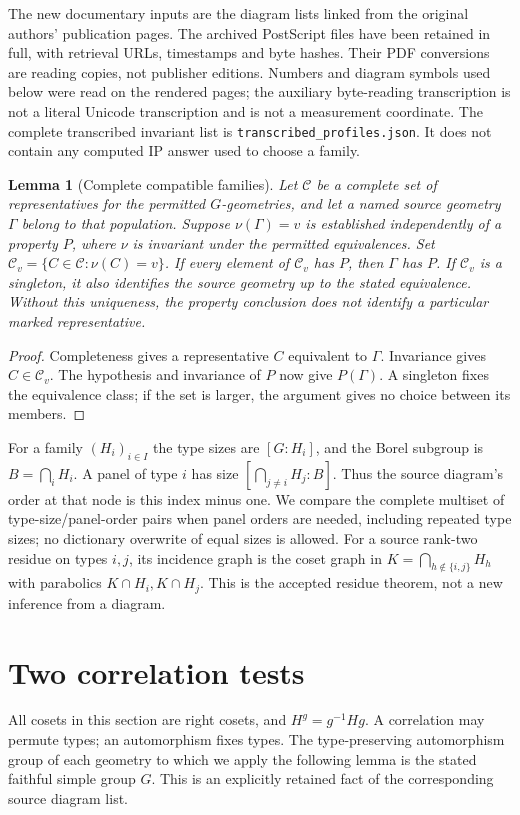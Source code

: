 \documentclass[11pt,a4paper]{article}
\newtheorem{lemma}[theorem]{Lemma}
\begin{document}
The new documentary inputs are the diagram lists linked from the
original authors' publication pages. The archived PostScript files have
been retained in full, with retrieval URLs, timestamps and byte hashes.
Their PDF conversions are reading copies, not publisher editions.
Numbers and diagram symbols used below were read on the rendered pages;
the auxiliary byte-reading transcription is not a literal Unicode
transcription and is not a measurement coordinate. The complete
transcribed invariant list is \texttt{transcribed\_profiles.json}.
It does not contain any computed IP answer used to choose a family.

\begin{lemma}[Complete compatible families]\label{fibre}
Let $\mathcal C$ be a complete set of representatives for the permitted
$G$-geometries, and let a named source geometry $\Gamma$ belong to that
population. Suppose $\nu(\Gamma)=v$ is established independently of a
property $P$, where $\nu$ is invariant under the permitted equivalences.
Set $\mathcal C_v=\{C\in\mathcal C:\nu(C)=v\}$. If every element of
$\mathcal C_v$ has $P$, then $\Gamma$ has $P$. If $\mathcal C_v$ is a
singleton, it also identifies the source geometry up to the stated
equivalence. Without this uniqueness, the property conclusion does not
identify a particular marked representative.
\end{lemma}
\begin{proof}
Completeness gives a representative $C$ equivalent to $\Gamma$.
Invariance gives $C\in\mathcal C_v$. The hypothesis and invariance of
$P$ now give $P(\Gamma)$. A singleton fixes the equivalence class;
if the set is larger, the argument gives no choice between its members.
\end{proof}

For a family $(H_i)_{i\in I}$ the type sizes are $[G:H_i]$, and the
Borel subgroup is $B=\bigcap_iH_i$. A panel of type $i$ has size
$[\bigcap_{j\ne i}H_j:B]$. Thus the source diagram's order at that
node is this index minus one. We compare the complete multiset of
type-size/panel-order pairs when panel orders are needed, including
repeated type sizes; no dictionary overwrite of equal sizes is allowed.
For a source rank-two residue on types $i,j$, its incidence graph is
the coset graph in $K=\bigcap_{h\notin\{i,j\}}H_h$ with parabolics
$K\cap H_i,K\cap H_j$. This is the accepted residue theorem, not a
new inference from a diagram.

\section{Two correlation tests}\label{correlations}
All cosets in this section are right cosets, and $H^g=g^{-1}Hg$.
A correlation may permute types; an automorphism fixes types. The
type-preserving automorphism group of each geometry to which we apply
the following lemma is the stated faithful simple group $G$. This is
an explicitly retained fact of the corresponding source diagram list.
\end{document}
